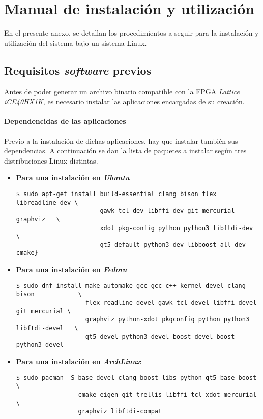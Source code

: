 \chapter{Manual de instalación y utilización}
\label{ch:manual}

En el presente anexo, se detallan los procedimientos a seguir para la instalación y utilización del sistema bajo un sistema Linux.

\section{Requisitos \emph{software} previos}
Antes de poder generar un archivo binario compatible con la FPGA \emph{Lattice iCE40HX1K}, es necesario instalar las aplicaciones encargadas de su creación.

\subsubsection{Dependencidas de las aplicaciones}
Previo a la instalación de dichas aplicaciones, hay que instalar también sus dependencias. A continuación se dan la lista de paquetes a instalar según tres distribuciones Linux distintas.

\begin{itemize}
    \item \textbf{Para una instalación en \emph{Ubuntu}} \\
    \begin{verbatim}
$ sudo apt-get install build-essential clang bison flex libreadline-dev \
                       gawk tcl-dev libffi-dev git mercurial graphviz   \
                       xdot pkg-config python python3 libftdi-dev       \
                       qt5-default python3-dev libboost-all-dev cmake}
    \end{verbatim}

    \item \textbf{Para una instalación en \emph{Fedora}} \\
    \begin{verbatim}
$ sudo dnf install make automake gcc gcc-c++ kernel-devel clang bison            \
                   flex readline-devel gawk tcl-devel libffi-devel git mercurial \
                   graphviz python-xdot pkgconfig python python3 libftdi-devel   \
                   qt5-devel python3-devel boost-devel boost-python3-devel
    \end{verbatim}

    \item \textbf{Para una instalación en \emph{ArchLinux}} \\
    \begin{verbatim}
$ sudo pacman -S base-devel clang boost-libs python qt5-base boost \
                 cmake eigen git trellis libffi tcl xdot mercurial \
                 graphviz libftdi-compat 
    \end{verbatim}
\end{itemize}

